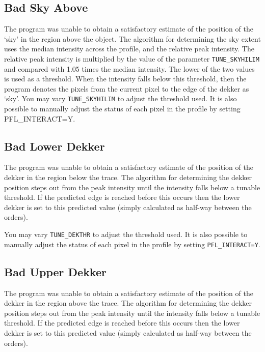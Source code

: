\subsection{ Bad Sky Above}

The program was unable to obtain a satisfactory estimate of the position
of the `sky' in the region above the object. The algorithm for
determining the sky extent uses the median intensity across the profile,
and the relative peak intensity. The relative peak intensity is
multiplied by the value of the parameter \verb+TUNE_SKYHILIM+ and compared
with 1.05 times the median intensity. The lower of the two values is used as
a threshold. When the intensity falls below this threshold,  then the
program denotes the pixels from the current pixel to the edge of the
dekker as `sky'.  You may vary \verb+TUNE_SKYHILIM+ to adjust the
threshold used. It is also possible to manually adjust the status of
each pixel in the profile by setting PFL\_INTERACT=Y.

\subsection{ Bad Lower Dekker}

The program was unable to obtain a satisfactory estimate of the position
of the dekker in the region below the trace. The algorithm for
determining the dekker position steps out from the peak intensity until
the intensity falls below a tunable threshold. If the predicted edge is
reached before this occurs then the lower dekker is set to this
predicted value (simply calculated as half-way between the orders).

You may vary \verb+TUNE_DEKTHR+ to adjust the threshold used.
It is also possible to manually adjust the status of each pixel in the
profile by setting \verb+PFL_INTERACT=Y+\@.

\subsection{ Bad Upper Dekker}

The program was unable to obtain a satisfactory estimate of the position
of the dekker in the region above the trace. The algorithm for
determining the dekker position steps out from the peak intensity until
the intensity falls below a tunable threshold. If the predicted edge is
reached before this occurs then the lower dekker is set to this
predicted value (simply calculated as half-way between the orders).

